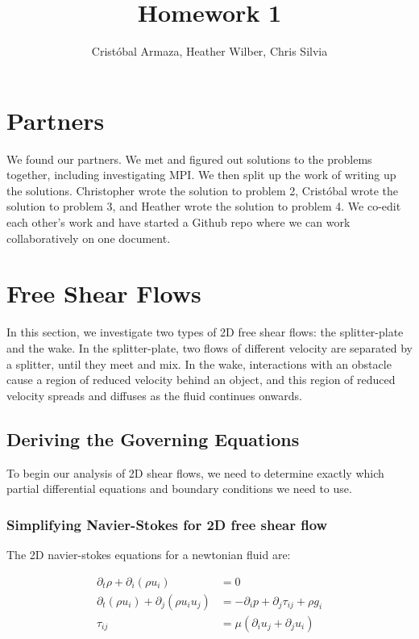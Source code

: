 \documentclass{article}
\title{Homework 1}
\author{Crist\'obal Armaza, Heather Wilber, Chris Silvia}
\begin{document}
\maketitle

\section{Partners}

We found our partners. We met and figured out solutions to the problems together, including investigating MPI.  We then split up the work of writing up the solutions. Christopher wrote the solution to problem 2, Crist\'obal wrote the solution to problem 3, and Heather wrote the solution to problem 4. We co-edit each other's work and have started a Github repo where we can work collaboratively on one document. 

\section{Free Shear Flows}

In this section, we investigate two types of 2D free shear flows:
	the splitter-plate and the wake.
In the splitter-plate, two flows of different velocity are separated by
	a splitter, until they meet and mix.
In the wake, interactions with an obstacle cause a region of reduced
	velocity behind an object, and this region of reduced
	velocity spreads and diffuses as the fluid continues onwards.

\subsection{Deriving the Governing Equations}

To begin our analysis of 2D shear flows, we need to determine exactly 
	which partial differential equations and boundary conditions
	we need to use.

\subsubsection{Simplifying Navier-Stokes for 2D free shear flow}

The 2D navier-stokes equations for a newtonian fluid are:

\begin{align}
\partial_t \rho + \partial_i \left( \rho u_i \right) & = 0 \\
\partial_t \left( \rho u_i \right) + \partial_j \left( \rho u_i u_j \right)
	& = - \partial_i p + \partial_j \tau_{ij} + \rho g_i\\
\tau_{ij} & = \mu \left( \partial_i u_j + \partial_j u_i \right)
\end{align}
\end{document}
